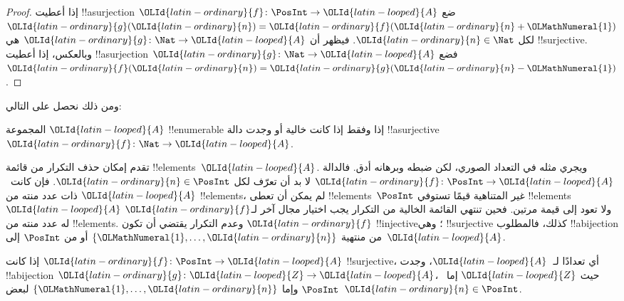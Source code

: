 \documentclass[../../../include/open-logic-section]{subfiles}
\begin{document}
\begin{proof}
إذا أعطيت !!a{surjection} ${\OLId{latin-ordinary}{f}}\colon \PosInt \to {\OLId{latin-looped}{A}}$ ضع ${\OLId{latin-ordinary}{g}}({\OLId{latin-ordinary}{n}}) = {\OLId{latin-ordinary}{f}}({\OLId{latin-ordinary}{n}}+{\OLMathNumeral{1}})$
لكل ${\OLId{latin-ordinary}{n}} \in \Nat$. فيظهر أن ${\OLId{latin-ordinary}{g}}\colon \Nat \to {\OLId{latin-looped}{A}}$ هي !!{surjective}.
وبالعكس، إذا أعطيت !!a{surjection} ${\OLId{latin-ordinary}{g}}\colon \Nat \to {\OLId{latin-looped}{A}}$
فضع ${\OLId{latin-ordinary}{f}}({\OLId{latin-ordinary}{n}}) = {\OLId{latin-ordinary}{g}}({\OLId{latin-ordinary}{n}}-{\OLMathNumeral{1}})$.
\end{proof}

ومن ذلك نحصل على التالي:

\begin{cor}
المجموعة ${\OLId{latin-looped}{A}}$ !!{enumerable} إذا وفقط إذا كانت خالية أو وجدت دالة
!!a{surjective} ${\OLId{latin-ordinary}{f}}\colon \Nat \to {\OLId{latin-looped}{A}}$.
\end{cor}

تقدم إمكان حذف التكرار من قائمة !!{element}s~${\OLId{latin-looped}{A}}$.
ويجري مثله في التعداد الصوري، لكن ضبطه وبرهانه أدق.
فالدالة ${\OLId{latin-ordinary}{f}}\colon \PosInt \to {\OLId{latin-looped}{A}}$ لا بد أن تعرّف لكل ${\OLId{latin-ordinary}{n}} \in \PosInt$.
فإن كانت~${\OLId{latin-looped}{A}}$ ذات عدد منته من !!{element}s، لم يمكن أن تعطى
!!{element}s~$\PosInt$ غير المتناهية قيمًا تستوفي !!{element}s~${\OLId{latin-looped}{A}}$
ولا تعود إلى قيمة مرتين. فحين تنتهي القائمة الخالية من التكرار
يجب اختيار مجال آخر لـ${\OLId{latin-ordinary}{f}}$ له عدد منته من !!{element}s.
وعدم التكرار يقتضي أن تكون ${\OLId{latin-ordinary}{f}}$ !!{injective}؛ وهي !!{surjective}
كذلك، فالمطلوب !!a{bijection} من منتهية $\{{\OLMathNumeral{1}}, \dots, {\OLId{latin-ordinary}{n}}\}$
أو من $\PosInt$ إلى~${\OLId{latin-looped}{A}}$.

\begin{prop}
إذا كانت ${\OLId{latin-ordinary}{f}}\colon \PosInt \to {\OLId{latin-looped}{A}}$ !!{surjective}، أي تعدادًا لـ~${\OLId{latin-looped}{A}}$،
وجدت !!a{bijection} ${\OLId{latin-ordinary}{g}}\colon {\OLId{latin-looped}{Z}} \to {\OLId{latin-looped}{A}}$، حيث ${\OLId{latin-looped}{Z}}$ إما~$\PosInt$
وإما $\{{\OLMathNumeral{1}}, \dots, {\OLId{latin-ordinary}{n}}\}$ لبعض~${\OLId{latin-ordinary}{n}} \in \PosInt$.
\end{prop}
\end{document}
